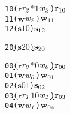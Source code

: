 \newsavebox{\boxTOne}
\begin{lrbox}{\boxTOne}
\begin{minipage}[t]{0.65\linewidth}
\large
\begin{alltt}
10 (\(\mathbf{r}\) \(\mathit{r\sb{2}}\) \(\mathit{\ast 1}\) \(\mathit{w\sb{2}}\)) \(\mathbf{r}\sb{10}\)
11 (\(\mathbf{w}\) \(\mathit{w\sb{2}}\)) \(\mathbf{w}\sb{11}\)
12 \underline{(\(\mathbf{s}\) \(\mathit{1 0}\)) \(\mathbf{s}\sb{12}\)}
\end{alltt}
\end{minipage}
\end{lrbox}

\newsavebox{\boxTTwo}
\begin{lrbox}{\boxTTwo}
\begin{minipage}[t]{0.65\linewidth}
\large
\begin{alltt}
20 \underline{(\(\mathbf{s}\) \(\mathit{2 0}\)) \(\mathbf{s}\sb{20}\)}
\end{alltt}
\end{minipage}
\end{lrbox}


\newcommand\examplefigone{
\begin{figure*}[tb]
\begin{center}
\setlength{\tabcolsep}{2pt}
\begin{tabular}[t]{c|c|c}
$\mathit{p_0}$ & $\mathit{p_1}$ & $\mathit{p_2}$ \\
\hline
\scalebox{0.8}{\usebox{\boxTZero}}&
\scalebox{0.8}{\usebox{\boxTOne}} &
\scalebox{0.8}{\usebox{\boxTTwo}}\\
\end{tabular}
\end{center}
\caption{A Deadlock Caused by Orphaned Receive}
\label{fig:deadlock1}
\end{figure*}
}



\newsavebox{\boxnozero}
\begin{lrbox}{\boxnozero}
\begin{minipage}[t]{0.65\linewidth}
\large
\begin{alltt}	
00 \underline{(\(\mathbf{r}\) \(\mathit{r\sb{0}}\) \(\mathit{\ast 0}\) \(\mathit{w\sb{0}}\)) \(\mathbf{r}\sb{00}\)}
01 (\(\mathbf{w}\) \(\mathit{w\sb{0}}\)) \(\mathbf{w}\sb{01}\)
02 (\(\mathbf{s}\) \(\mathit{0 1}\)) \(\mathbf{s}\sb{02}\)
03 \underline{(\(\mathbf{r}\) \(\mathit{r\sb{1}}\) \(\mathit{1 0}\) \(\mathit{w\sb{1}}\)) \(\mathbf{r}\sb{03}\)}
04 (\(\mathbf{w}\) \(\mathit{w\sb{1}}\)) \(\mathbf{w}\sb{04}\)
\end{alltt}
\end{minipage}
\end{lrbox}

